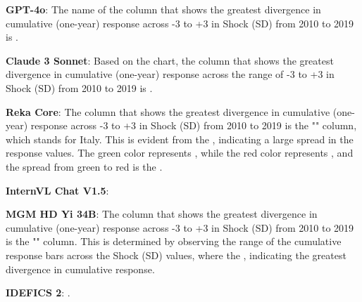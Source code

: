 \begin{wronganswer}
\textbf{GPT-4o}: \small{The name of the column that shows the greatest divergence in cumulative (one-year) response across -3 to +3 in Shock (SD) from 2010 to 2019 is .}
\end{wronganswer}

\begin{wronganswer}
\textbf{Claude 3 Sonnet}: \small{Based on the chart, the column that shows the greatest divergence in cumulative (one-year) response across the range of -3 to +3 in Shock (SD) from 2010 to 2019 is .}
\end{wronganswer}

\begin{wronganswer}
\textbf{Reka Core}: \small{ The column that shows the greatest divergence in cumulative (one-year) response across -3 to +3 in Shock (SD) from 2010 to 2019 is the "" column, which stands for Italy. This is evident from the , indicating a large spread in the response values. The green color represents , while the red color represents , and the spread from green to red is the .}
\end{wronganswer}

\begin{wronganswer}
\textbf{InternVL Chat V1.5}: \small{}
\end{wronganswer}

\begin{wronganswer}
\textbf{MGM HD Yi 34B}: \small{The column that shows the greatest divergence in cumulative (one-year) response across -3 to +3 in Shock (SD) from 2010 to 2019 is the "" column. This is determined by observing the range of the cumulative response bars across the Shock (SD) values, where the , indicating the greatest divergence in cumulative response.}
\end{wronganswer}

\begin{wronganswer}
\textbf{IDEFICS 2}: \small{.}
\end{wronganswer}
\newpage
